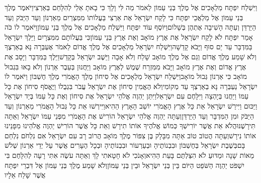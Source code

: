 \documentclass[../main/main.tex]{subfiles}
\begin{document}
\begin{multicols*}{\ncols}
וַיִּשְׁלַח יִפְתָּח מַלְאָכִים אֶל מֶלֶךְ בְּנֵי עַמּוֹן לֵאמֹר מַה לִּי וָלָךְ כִּי בָאתָ אֵלַי לְהִלָּחֵם בְּאַרְצִי\PreVerseSpace{}וַיֹּאמֶר מֶלֶךְ בְּנֵי עַמּוֹן אֶל מַלְאֲכֵי יִפְתָּח כִּי לָקַח יִשְׂרָאֵל אֶת אַרְצִי בַּעֲלוֹתוֹ מִמִּצְרַיִם מֵאַרְנוֹן וְעַד הַיַּבֹּק וְעַד הַיַּרְדֵּן וְעַתָּה הָשִׁיבָה אֶתְהֶן בְּשָׁלוֹם\PreVerseSpace{}וַיּוֹסֶף עוֹד יִפְתָּח וַיִּשְׁלַח מַלְאָכִים אֶל מֶלֶךְ בְּנֵי עַמּוֹן\PreVerseSpace{}וַיֹּאמֶר לוֹ כֹּה אָמַר יִפְתָּח לֹא לָקַח יִשְׂרָאֵל אֶת אֶרֶץ מוֹאָב וְאֶת אֶרֶץ בְּנֵי עַמּוֹן\PreVerseSpace{}כִּי בַּעֲלוֹתָם מִמִּצְרָיִם וַיֵּלֶךְ יִשְׂרָאֵל בַּמִּדְבָּר עַד יַם סוּף וַיָּבֹא קָדֵשָׁה\PreVerseSpace{}וַיִּשְׁלַח יִשְׂרָאֵל מַלְאָכִים אֶל מֶלֶךְ אֱדוֹם לֵאמֹר אֶעְבְּרָה נָּא בְאַרְצֶךָ וְלֹא שָׁמַע מֶלֶךְ אֱדוֹם וְגַם אֶל מֶלֶךְ מוֹאָב שָׁלַח וְלֹא אָבָה וַיֵּשֶׁב יִשְׂרָאֵל בְּקָדֵשׁ\PreVerseSpace{}וַיֵּלֶךְ בַּמִּדְבָּר וַיָּסָב אֶת אֶרֶץ אֱדוֹם וְאֶת אֶרֶץ מוֹאָב וַיָּבֹא מִמִּזְרַח שֶׁמֶשׁ לְאֶרֶץ מוֹאָב וַיַּחֲנוּן בְּעֵבֶר אַרְנוֹן וְלֹא בָאוּ בִּגְבוּל מוֹאָב כִּי אַרְנוֹן גְּבוּל מוֹאָב\PreVerseSpace{}וַיִּשְׁלַח יִשְׂרָאֵל מַלְאָכִים אֶל סִיחוֹן מֶלֶךְ הָאֱמֹרִי מֶלֶךְ חֶשְׁבּוֹן וַיֹּאמֶר לוֹ יִשְׂרָאֵל נַעְבְּרָה נָּא בְאַרְצְךָ עַד מְקוֹמִי\PreVerseSpace{}וְלֹא הֶאֱמִין סִיחוֹן אֶת יִשְׂרָאֵל עֲבֹר בִּגְבֻלוֹ וַיֶּאֱסֹף סִיחוֹן אֶת כָּל עַמּוֹ וַיַּחֲנוּ בְּיָהְצָה וַיִּלָּחֶם עִם יִשְׂרָאֵל\PreVerseSpace{}וַיִּתֵּן יַהְוֶה אֱלֹהֵי יִשְׂרָאֵל אֶת סִיחוֹן וְאֶת כָּל עַמּוֹ בְּיַד יִשְׂרָאֵל וַיַּכּוּם וַיִּירַשׁ יִשְׂרָאֵל אֵת כָּל אֶרֶץ הָאֱמֹרִי יוֹשֵׁב הָאָרֶץ הַהִיא\PreVerseSpace{}וַיִּירְשׁוּ אֵת כָּל גְּבוּל הָאֱמֹרִי מֵאַרְנוֹן וְעַד הַיַּבֹּק וּמִן הַמִּדְבָּר וְעַד הַיַּרְדֵּן\PreVerseSpace{}וְעַתָּה יַהְוֶה אֱלֹהֵי יִשְׂרָאֵל הוֹרִישׁ אֶת הָאֱמֹרִי מִפְּנֵי עַמּוֹ יִשְׂרָאֵל וְאַתָּה תִּירָשֶׁנּוּ\PreVerseSpace{}הֲלֹא אֵת אֲשֶׁר יוֹרִישְׁךָ כְּמוֹשׁ אֱלֹהֶיךָ אוֹתוֹ תִירָשׁ וְאֵת כָּל אֲשֶׁר הוֹרִישׁ יַהְוֶה אֱלֹהֵינוּ מִפָּנֵינוּ אוֹתוֹ נִירָשׁ\PreVerseSpace{}וְעַתָּה הֲטוֹב טוֹב אַתָּה מִבָּלָק בֶּן צִפּוֹר מֶלֶךְ מוֹאָב הֲרוֹב רָב עִם יִשְׂרָאֵל אִם נִלְחֹם נִלְחַם בָּם\PreVerseSpace{}בְּשֶׁבֶת יִשְׂרָאֵל בְּחֶשְׁבּוֹן וּבִבְנוֹתֶיהָ וּבְעַרְעוֹר וּבִבְנוֹתֶיהָ וּבְכָל הֶעָרִים אֲשֶׁר עַל יְדֵי אַרְנוֹן שְׁלֹשׁ מֵאוֹת שָׁנָה וּמַדּוּעַ לֹא הִצַּלְתֶּם בָּעֵת הַהִיא\PreVerseSpace{}וְאָנֹכִי לֹא חָטָאתִי לָךְ וְאַתָּה עֹשֶׂה אִתִּי רָעָה לְהִלָּחֶם בִּי יִשְׁפֹּט יַהְוֶה הַשֹּׁפֵט הַיּוֹם בֵּין בְּנֵי יִשְׂרָאֵל וּבֵין בְּנֵי עַמּוֹן\PreVerseSpace{}וְלֹא שָׁמַע מֶלֶךְ בְּנֵי עַמּוֹן אֶל דִּבְרֵי יִפְתָּח אֲשֶׁר שָׁלַח אֵלָיו\OpenSection{}\par

\end{multicols*}
\end{document}
